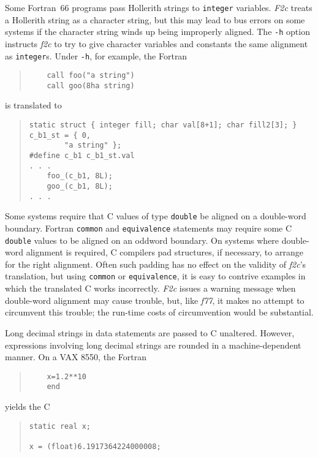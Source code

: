 \documentclass[10pt,a4paper]{article}
\begin{document}
Some Fortran~66 programs pass Hollerith strings to \verb|integer| variables. \emph{F2c} treats a Hollerith string as a character string, but this may lead to bus errors on some systems if the character string winds up being improperly aligned. The \verb|-h| option instructs \emph{f2c} to try to give character variables and constants the same alignment as \verb|integer|s. Under \verb|-h|, for example, the Fortran
\begin{quote}
\begin{verbatim}
    call foo("a string")
    call goo(8ha string)
\end{verbatim}
\end{quote}
is translated to
\begin{quote}
\begin{verbatim}
static struct { integer fill; char val[8+1]; char fill2[3]; } c_b1_st = { 0,
        "a string" };
#define c_b1 c_b1_st.val
. . .
    foo_(c_b1, 8L);
    goo_(c_b1, 8L);
. . .
\end{verbatim}
\end{quote}

Some systems require that C values of type \verb|double| be aligned on a double-word boundary. Fortran \verb|common| and \verb|equivalence| statements may require some C \verb|double| values to be aligned on an oddword boundary. On systems where double-word alignment is required, C compilers pad structures, if necessary, to arrange for the right alignment. Often such padding has no effect on the validity of \emph{f2c}’s translation, but using \verb|common| or \verb|equivalence|, it is easy to contrive examples in which the translated C works incorrectly. \emph{F2c} issues a warning message when double-word alignment may cause trouble, but, like \emph{f77}, it makes no attempt to circumvent this trouble; the run-time costs of circumvention would be substantial.

Long decimal strings in data statements are passed to C unaltered. However, expressions involving long decimal strings are rounded in a machine-dependent manner. On a VAX 8550, the Fortran
\begin{quote}
\begin{verbatim}
    x=1.2**10
    end
\end{verbatim}
\end{quote}
yields the C
\begin{quote}
\begin{verbatim}
static real x;

x = (float)6.1917364224000008;
\end{verbatim}
\end{quote}
\end{document}
